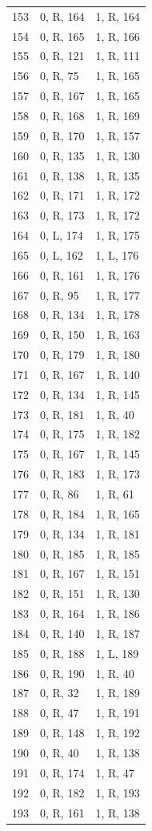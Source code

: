 \begin{longtable}{@{}rll@{}}
153 & 0, R, 164 & 1, R, 164\\
154 & 0, R, 165 & 1, R, 166\\
155 & 0, R, 121 & 1, R, 111\\
156 & 0, R, 75 & 1, R, 165\\
157 & 0, R, 167 & 1, R, 165\\
158 & 0, R, 168 & 1, R, 169\\
159 & 0, R, 170 & 1, R, 157\\
160 & 0, R, 135 & 1, R, 130\\
161 & 0, R, 138 & 1, R, 135\\
162 & 0, R, 171 & 1, R, 172\\
163 & 0, R, 173 & 1, R, 172\\
164 & 0, L, 174 & 1, R, 175\\
165 & 0, L, 162 & 1, L, 176\\
166 & 0, R, 161 & 1, R, 176\\
167 & 0, R, 95 & 1, R, 177\\
168 & 0, R, 134 & 1, R, 178\\
169 & 0, R, 150 & 1, R, 163\\
170 & 0, R, 179 & 1, R, 180\\
171 & 0, R, 167 & 1, R, 140\\
172 & 0, R, 134 & 1, R, 145\\
173 & 0, R, 181 & 1, R, 40\\
174 & 0, R, 175 & 1, R, 182\\
175 & 0, R, 167 & 1, R, 145\\
176 & 0, R, 183 & 1, R, 173\\
177 & 0, R, 86 & 1, R, 61\\
178 & 0, R, 184 & 1, R, 165\\
179 & 0, R, 134 & 1, R, 181\\
180 & 0, R, 185 & 1, R, 185\\
181 & 0, R, 167 & 1, R, 151\\
182 & 0, R, 151 & 1, R, 130\\
183 & 0, R, 164 & 1, R, 186\\
184 & 0, R, 140 & 1, R, 187\\
185 & 0, R, 188 & 1, L, 189\\
186 & 0, R, 190 & 1, R, 40\\
187 & 0, R, 32 & 1, R, 189\\
188 & 0, R, 47 & 1, R, 191\\
189 & 0, R, 148 & 1, R, 192\\
190 & 0, R, 40 & 1, R, 138\\
191 & 0, R, 174 & 1, R, 47\\
192 & 0, R, 182 & 1, R, 193\\
193 & 0, R, 161 & 1, R, 138\\
\bottomrule\end{longtable}
